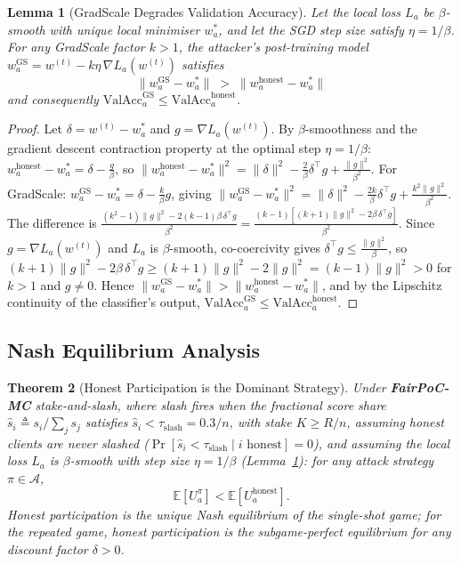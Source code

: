 \documentclass[journal]{IEEEtran}
\newtheorem{theorem}{Theorem}
\newtheorem{lemma}[theorem]{Lemma}
\theoremstyle{definition}
\theoremstyle{remark}
\begin{document}
\begin{lemma}[GradScale Degrades Validation Accuracy]
\label{lem:gradscale_valacc}
Let the local loss $L_a$ be $\beta$-smooth with unique local minimiser
$w_a^*$, and let the SGD step size satisfy $\eta = 1/\beta$.
For any GradScale factor $k > 1$, the attacker's post-training model
$w_a^{\mathrm{GS}} = w^{(t)} - k\eta\,\nabla L_a(w^{(t)})$ satisfies
\begin{equation}
  \|w_a^{\mathrm{GS}} - w_a^*\| \;>\; \|w_a^{\mathrm{honest}} - w_a^*\|
  \label{eq:overshoot}
\end{equation}
and consequently $\mathrm{ValAcc}_a^{\mathrm{GS}} \leq \mathrm{ValAcc}_a^{\mathrm{honest}}$.
\end{lemma}
\begin{proof}
Let $\delta = w^{(t)} - w_a^*$ and $g = \nabla L_a(w^{(t)})$.
By $\beta$-smoothness and the gradient descent contraction property
at the optimal step $\eta = 1/\beta$:
$w_a^{\mathrm{honest}} - w_a^* = \delta - \frac{g}{\beta}$,
so $\|w_a^{\mathrm{honest}} - w_a^*\|^2 = \|\delta\|^2 - \frac{2}{\beta}\delta^\top g + \frac{\|g\|^2}{\beta^2}$.
For GradScale: $w_a^{\mathrm{GS}} - w_a^* = \delta - \frac{k}{\beta}g$, giving
$\|w_a^{\mathrm{GS}} - w_a^*\|^2 = \|\delta\|^2 - \frac{2k}{\beta}\delta^\top g + \frac{k^2\|g\|^2}{\beta^2}$.
The difference is $\frac{(k^2-1)\|g\|^2 - 2(k-1)\beta\,\delta^\top g}{\beta^2}
= \frac{(k-1)[(k+1)\|g\|^2 - 2\beta\,\delta^\top g]}{\beta^2}$.
Since $g = \nabla L_a(w^{(t)})$ and $L_a$ is $\beta$-smooth, co-coercivity
gives $\delta^\top g \leq \frac{\|g\|^2}{\beta}$, so
$(k+1)\|g\|^2 - 2\beta\,\delta^\top g \geq (k+1)\|g\|^2 - 2\|g\|^2 = (k-1)\|g\|^2 > 0$
for $k > 1$ and $g \neq 0$.
Hence $\|w_a^{\mathrm{GS}} - w_a^*\| > \|w_a^{\mathrm{honest}} - w_a^*\|$,
and by the Lipschitz continuity of the classifier's output,
$\mathrm{ValAcc}_a^{\mathrm{GS}} \leq \mathrm{ValAcc}_a^{\mathrm{honest}}$.
\end{proof}

\subsection{Nash Equilibrium Analysis}

\begin{theorem}[Honest Participation is the Dominant Strategy]
\label{thm:nash}
Under \textbf{FairPoC-MC} stake-and-slash, where slash fires when
the fractional score share $\hat{s}_i \triangleq s_i / \sum_j s_j$
satisfies $\hat{s}_i < \tau_{\mathrm{slash}} = 0.3/n$, with stake
$K \geq R/n$, assuming honest clients are never slashed
($\Pr[\hat{s}_i < \tau_{\mathrm{slash}} \mid i \text{ honest}] = 0$),
and assuming the local loss $L_a$ is $\beta$-smooth with step size
$\eta = 1/\beta$ (Lemma~\ref{lem:gradscale_valacc}):
for any attack strategy $\pi \in \mathcal{A}$,
\begin{equation}
  \mathbb{E}[U_a^{\pi}] < \mathbb{E}[U_a^{\mathrm{honest}}].
  \label{eq:dominant}
\end{equation}
Honest participation is the unique Nash equilibrium of the
single-shot game; for the repeated game, honest participation
is the subgame-perfect equilibrium for any discount factor
$\delta > 0$.
\end{theorem}
\end{document}
